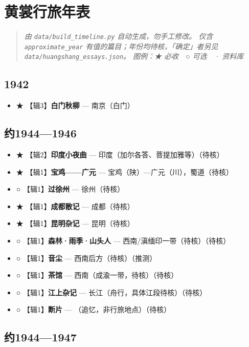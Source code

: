 \documentclass[UTF8,fontset=none,zihao=-4,a4paper]{ctexart}
\begin{document}
\section{黄裳行旅年表}


\begin{quote}\small\itshape
由 \texttt{data/build\_timeline.py} 自动生成，勿手工修改。 仅含 \texttt{approximate\_year} 有值的篇目；年份均待核，「确定」者另见 \texttt{data/huangshang\_essays.json}。 图例：★ 必收　○ 可选　· 资料库
\end{quote}

\subsection{1942}


\begin{itemize}
\item ★ 【辑3】\textbf{白门秋柳} — 南京（白门）
\end{itemize}


\subsection{约1944—1946}


\begin{itemize}
\item ★ 【辑2】\textbf{印度小夜曲} — 印度（加尔各答、菩提加雅等）（待核）
\item ★ 【辑1】\textbf{宝鸡——广元} — 宝鸡（陕）—广元（川），蜀道（待核）
\item ○ 【辑1】\textbf{过徐州} — 徐州（待核）
\item ★ 【辑1】\textbf{成都散记} — 成都（待核）
\item ★ 【辑1】\textbf{昆明杂记} — 昆明（待核）
\item ○ 【辑1】\textbf{森林·雨季·山头人} — 西南/滇缅印一带（待核）（待核）
\item ○ 【辑1】\textbf{音尘} — 西南后方（待核）（推测）
\item ○ 【辑1】\textbf{茶馆} — 西南（成渝一带，待核）（待核）
\item ○ 【辑1】\textbf{江上杂记} — 长江（舟行，具体江段待核）（待核）
\item ○ 【辑1】\textbf{断片} — （追忆，非行旅地点）（待核）
\end{itemize}


\subsection{约1944—1947}
\end{document}
